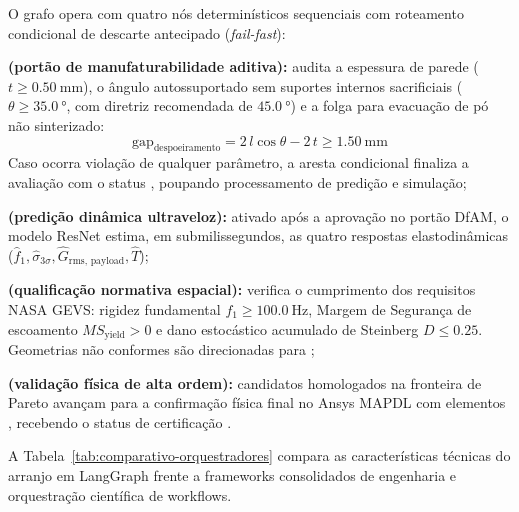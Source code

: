 O grafo opera com quatro nós determinísticos sequenciais com roteamento condicional de descarte antecipado (\textit{fail-fast}):
\begin{alineas}
  \item \textbf{ (portão de manufaturabilidade aditiva):} audita a espessura de parede ($t \ge \SI{0.50}{\milli\metre}$), o ângulo autossuportado sem suportes internos sacrificiais ($\theta \ge \SI{35.0}{\degree}$, com diretriz recomendada de $\SI{45.0}{\degree}$) e a folga para evacuação de pó não sinterizado:
  \begin{equation}
    \text{gap}_{\text{despoeiramento}} = 2\, l \cos\theta - 2\, t \ge \SI{1.50}{\milli\metre}
    \label{eq:gap}
  \end{equation}
  Caso ocorra violação de qualquer parâmetro, a aresta condicional  finaliza a avaliação com o status , poupando processamento de predição e simulação;
  \item \textbf{ (predição dinâmica ultraveloz):} ativado após a aprovação no portão DfAM, o modelo ResNet estima, em submilissegundos, as quatro respostas elastodinâmicas ($\hat{f}_1, \hat{\sigma}_{3\sigma}, \hat{G}_{\text{rms, payload}}, \hat{T}$);
  \item \textbf{ (qualificação normativa espacial):} verifica o cumprimento dos requisitos NASA GEVS: rigidez fundamental $f_1 \ge \SI{100.0}{\hertz}$, Margem de Segurança de escoamento $MS_{\text{yield}} > 0$ e dano estocástico acumulado de Steinberg $D \le \num{0.25}$. Geometrias não conformes são direcionadas para ;
  \item \textbf{ (validação física de alta ordem):} candidatos homologados na fronteira de Pareto avançam para a confirmação física final no Ansys MAPDL com elementos , recebendo o status de certificação .
\end{alineas}

A Tabela~\ref{tab:comparativo-orquestradores} compara as características técnicas do arranjo em LangGraph frente a frameworks consolidados de engenharia e orquestração científica de workflows.

